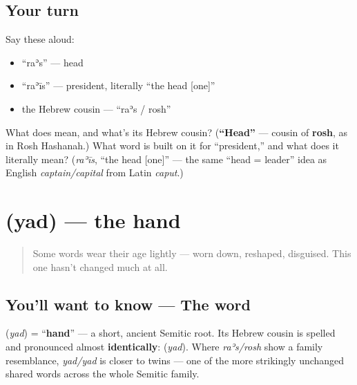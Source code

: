 \subsection*{Your turn}
Say these aloud:

\begin{itemize}
\raggedright
  \item \textquotedblleft{}raʾs\textquotedblright{} — head
  \item \textquotedblleft{}raʾīs\textquotedblright{} — president, literally \textquotedblleft{}the head {[}one{]}\textquotedblright{}
  \item the Hebrew cousin — \textquotedblleft{}raʾs / rosh\textquotedblright{}
\end{itemize}

\begin{tcolorbox}[breakable,colback=teal!4,colframe=teal!35!black,title={Before you move on}]
What does \textbf{} mean, and what's its Hebrew cousin? (\textbf{\textquotedblleft{}Head\textquotedblright{}} — cousin of \textbf{rosh}, as in Rosh Hashanah.) What word is built on it for \textquotedblleft{}president,\textquotedblright{} and what does it literally mean? (\emph{raʾīs}, \textquotedblleft{}the head {[}one{]}\textquotedblright{} — the same \textquotedblleft{}head = leader\textquotedblright{} idea as English \emph{captain/capital} from Latin \emph{caput}.)
\end{tcolorbox}
\section[\texorpdfstring{\ar{يد} (yad)}{يد (yad)}]{ (yad) — the hand}

\label{lesson:AR-C11-yad}



\begin{quote}
Some words wear their age lightly — worn down, reshaped, disguised. This one hasn't changed much at all.
\end{quote}

\subsection*{You'll want to know — The word}
\textbf{} (\emph{yad}) = \textquotedblleft{}\textbf{hand}\textquotedblright{} — a short, ancient Semitic root. Its Hebrew cousin is spelled and pronounced almost \textbf{identically}: \textbf{} (\emph{yad}). Where \emph{raʾs/rosh} show a family resemblance, \emph{yad/yad} is closer to twins — one of the more strikingly unchanged shared words across the whole Semitic family.


